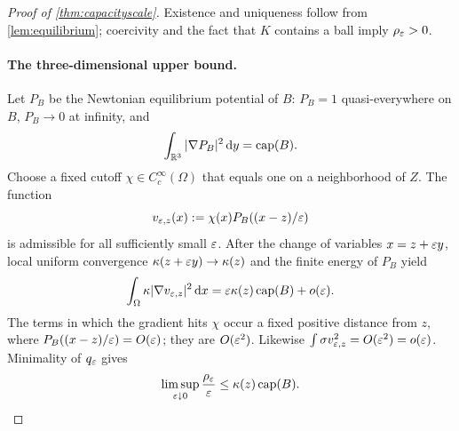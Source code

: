 \begin{proof}[Proof of \cref{thm:capacityscale}]
Existence and uniqueness follow from \cref{lem:equilibrium}; coercivity and
the fact that $K$ contains a ball imply $\rho_\varepsilon>0$.

\paragraph{The three-dimensional upper bound.}
Let $P_B$ be the Newtonian equilibrium potential of $B$:
$P_B=1$ quasi-everywhere on $B$, $P_B\to0$ at infinity, and
\begin{equation}
 \int_{\mathbb{R}^3}|\nabla P_B|^2\,\mathrm dy=\operatorname{cap}(B).
 \label{eq:newtoniancapacity}
\end{equation}
Choose a fixed cutoff $\chi\in C_c^\infty(\Omega)$ that equals one on a
neighborhood of $Z$.  The function
\begin{equation}
 v_{\varepsilon,z}(x):=\chi(x)P_B((x-z)/\varepsilon)
\end{equation}
is admissible for all sufficiently small $\varepsilon$.  After the change of
variables $x=z+\varepsilon y$, local uniform convergence
$\kappa(z+\varepsilon y)\to\kappa(z)$ and the finite energy of $P_B$ yield
\begin{equation}
 \int_\Omega\kappa|\nabla v_{\varepsilon,z}|^2\,\mathrm dx
 =\varepsilon\kappa(z)\operatorname{cap}(B)+o(\varepsilon).
 \label{eq:capupper3dgrad}
\end{equation}
The terms in which the gradient hits $\chi$ occur a fixed positive distance
from $z$, where $P_B((x-z)/\varepsilon)=O(\varepsilon)$; they are $O(\varepsilon^2)$.  Likewise
$\int\sigma v_{\varepsilon,z}^2=O(\varepsilon^2)=o(\varepsilon)$.  Minimality of $q_\varepsilon$ gives
\begin{equation}
 \limsup_{\varepsilon\downarrow0}\frac{\rho_\varepsilon}{\varepsilon}
 \le\kappa(z)\operatorname{cap}(B).
 \label{eq:capupper3d}
\end{equation}


\end{proof}
